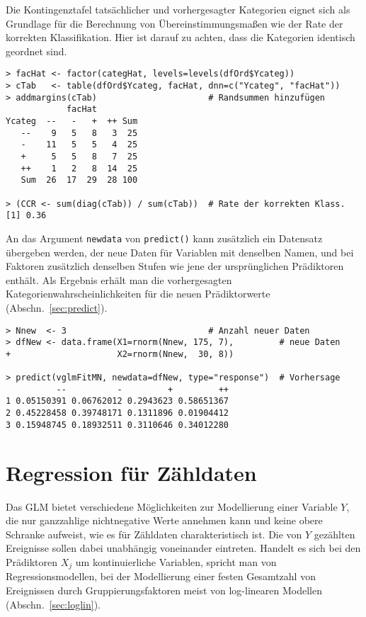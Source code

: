 Die Kontingenztafel tatsächlicher und vorhergesagter Kategorien eignet sich als Grundlage für die Berechnung von Übereinstimmungsmaßen wie der Rate der korrekten Klassifikation. Hier ist darauf zu achten, dass die Kategorien identisch geordnet sind.
\begin{lstlisting}
> facHat <- factor(categHat, levels=levels(dfOrd$Ycateg))
> cTab   <- table(dfOrd$Ycateg, facHat, dnn=c("Ycateg", "facHat"))
> addmargins(cTab)                      # Randsummen hinzufügen
            facHat
Ycateg  --   -   +  ++ Sum
   --    9   5   8   3  25
   -    11   5   5   4  25
   +     5   5   8   7  25
   ++    1   2   8  14  25
   Sum  26  17  29  28 100

> (CCR <- sum(diag(cTab)) / sum(cTab))  # Rate der korrekten Klass.
[1] 0.36
\end{lstlisting}

An das Argument \lstinline!newdata! von \lstinline!predict()! kann zusätzlich ein Datensatz übergeben werden, der neue Daten für Variablen mit denselben Namen, und bei Faktoren zusätzlich denselben Stufen wie jene der ursprünglichen Prädiktoren enthält. Als Ergebnis erhält man die vorhergesagten Kategorienwahrscheinlichkeiten für die neuen Prädiktorwerte (Abschn.\ \ref{sec:predict}).
\begin{lstlisting}
> Nnew  <- 3                            # Anzahl neuer Daten
> dfNew <- data.frame(X1=rnorm(Nnew, 175, 7),         # neue Daten
+                     X2=rnorm(Nnew,  30, 8))

> predict(vglmFitMN, newdata=dfNew, type="response")  # Vorhersage
          --          -         +         ++
1 0.05150391 0.06762012 0.2943623 0.58651367
2 0.45228458 0.39748171 0.1311896 0.01904412
3 0.15948745 0.18932511 0.3110646 0.34012280
\end{lstlisting}

\section{Regression für Zähldaten}
\label{sec:regrCount}

Das GLM bietet verschiedene Möglichkeiten zur Modellierung einer Variable $Y$, die nur ganzzahlige nichtnegative Werte annehmen kann und keine obere Schranke aufweist, wie es für Zähldaten charakteristisch ist. Die von $Y$ gezählten Ereignisse sollen dabei unabhängig voneinander eintreten. Handelt es sich bei den Prädiktoren $X_{j}$ um kontinuierliche Variablen, spricht man von Regressionsmodellen, bei der Modellierung einer festen Gesamtzahl von Ereignissen durch Gruppierungsfaktoren meist von log-linearen Modellen (Abschn.\ \ref{sec:loglin}).

